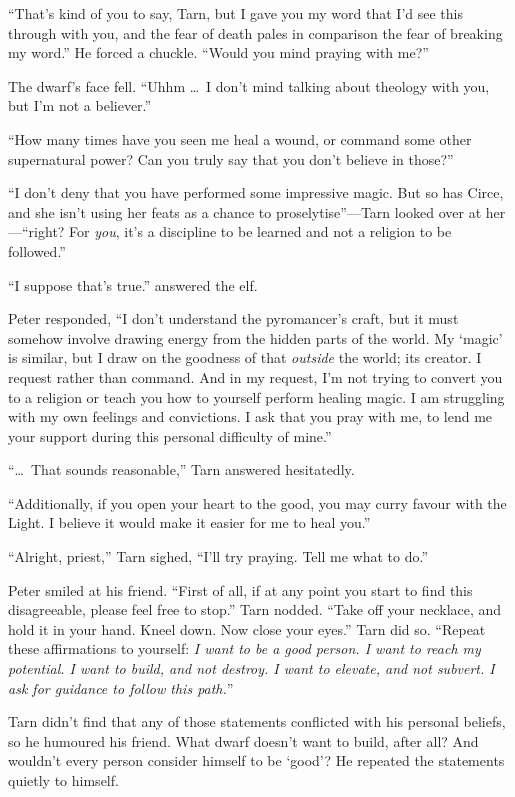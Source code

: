 ``That's kind of you to say, Tarn, but I gave you my word that I'd see this through with you, and the fear of death pales in comparison the fear of breaking my word.''  He forced a chuckle.  ``Would you mind praying with me?''

The dwarf's face fell.  ``Uhhm \ldots\ I don't mind talking about theology with you, but I'm not a believer.''

``How many times have you seen me heal a wound, or command some other supernatural power?  Can you truly say that you don't believe in those?''

``I don't deny that you have performed some impressive magic.  But so has Circe, and she isn't using her feats as a chance to proselytise''---Tarn looked over at her---``right?  For \emph{you}, it's a discipline to be learned and not a religion to be followed.''

``I suppose that's true.'' answered the elf.

Peter responded, ``I don't understand the pyromancer's craft, but it must somehow involve drawing energy from the hidden parts of the world.  My `magic' is similar, but I draw on the goodness of that \emph{outside} the world; its creator.  I request rather than command.  And in my request, I'm not trying to convert you to a religion or teach you how to yourself perform healing magic.  I am struggling with my own feelings and convictions. I ask that you pray with me, to lend me your support during this personal difficulty of mine.''

``\ldots\ That sounds reasonable,'' Tarn answered hesitatedly.

``Additionally, if you open your heart to the good, you may curry favour with the Light.  I believe it would make it easier for me to heal you.''

``Alright, priest,'' Tarn sighed, ``I'll try praying.  Tell me what to do.''

Peter smiled at his friend.  ``First of all, if at any point you start to find this disagreeable, please feel free to stop.''  Tarn nodded.  ``Take off your necklace, and hold it in your hand.  Kneel down.  Now close your eyes.''  Tarn did so.  ``Repeat these affirmations to yourself: \emph{I want to be a good person.  I want to reach my potential.  I want to build, and not destroy.  I want to elevate, and not subvert.  I ask for guidance to follow this path.}''

Tarn didn't find that any of those statements conflicted with his personal beliefs, so he humoured his friend.  What dwarf doesn't want to build, after all?  And wouldn't every person consider himself to be `good'?  He repeated the statements quietly to himself.

